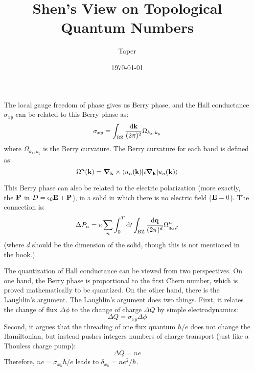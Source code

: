 \documentclass{article}
\title{Shen's View on Topological Quantum Numbers}
\date{\today}
\author{Taper}
\begin{document}
\maketitle
{}
\tableofcontents

The local gauge freedom of phase gives us Berry phase, and the Hall conductance
$\sigma_{xy}$ can be related to this Berry phase as:
\begin{equation}
    \sigma_{xy} = \int_{\mathrm{BZ}} \frac{\dd{\vb k}}{(2\pi)^2}
    \Omega_{k_x,k_y}
\end{equation}
where $\Omega_{k_x,k_y}$ is the Berry curvature. The Berry curvature for each
band is defined as
\begin{equation}
    \Omega^n(\vb k) = \grad_{\vb k} \times
        \braket{ u_n(\vb k) | i \grad_{\vb{k}} | u_n(\vb{k})}
\end{equation}

This Berry phase can also be related to the electric polarization (more exactly,
the $\vb P$ in $D=\epsilon_0 \vb{E} + \vb{P}$), in a solid in which there is no
electric field ($\vb{E}=0$). The connection is:
\begin{equation}
    \Delta P_{\alpha} = e \sum_n \int_0^T\dd{t} 
    \int_{\mathrm{BZ}} \frac{\dd{\vb q}}{(2\pi)^d}\Omega^n_{q_\alpha,t}
\end{equation}
(where $d$ should be the dimension of the solid, though this is not mentioned
in the book.)

The quantization of Hall conductance can be viewed from two perspectives. On one
hand, the Berry phase is proportional to the first Chern number, which is proved
mathematically to be quantized. On the other hand, there is the Laughlin's
argument. The Laughlin's argument does two things. First, it relates the change
of flux $\Delta \phi$ to the change of charge $\Delta Q$ by simple
electrodynamics:
\begin{equation}
    \Delta Q = \sigma_{xy} \Delta \phi
\end{equation}
Second, it argues that the threading of one flux quantum $\hbar/e$ does not change the
Hamiltonian, but instead pushes integers numbers of charge transport (just like
a Thouless charge pump):
\begin{equation}
    \Delta Q = n e
\end{equation}
Therefore, $ne = \sigma_{xy} \hbar/e$ leads to $\delta_{xy} = n e^2/\hbar$.
\end{document}
